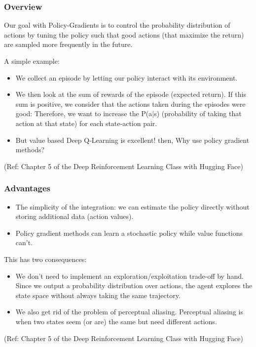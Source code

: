 \begin{frame}[fragile]\frametitle{Overview }

Our goal with Policy-Gradients is to control the probability distribution of actions by tuning the policy such that good actions (that maximize the return) are sampled more frequently in the future.

A simple example:
 
\begin{itemize}
\item We collect an episode by letting our policy interact with its environment.
\item We then look at the sum of rewards of the episode (expected return). If this sum is positive, we consider that the actions taken during the episodes were good: Therefore, we want to increase the P(a|s) (probability of taking that action at that state) for each state-action pair.
\item But value based Deep Q-Learning is excellent! then, Why use policy gradient methods?
\end{itemize}

{\tiny (Ref: Chapter 5 of the Deep Reinforcement Learning Class with Hugging Face)}

\end{frame}

\begin{frame}[fragile]\frametitle{Advantages  }

\begin{itemize}
\item The simplicity of the integration: we can estimate the policy directly without storing additional data (action values).
\item Policy gradient methods can learn a stochastic policy while value functions can't.
\end{itemize}

This has two consequences:

\begin{itemize}
\item We don't need to implement an exploration/exploitation trade-off by hand. Since we output a probability distribution over actions, the agent explores the state space without always taking the same trajectory.
\item We also get rid of the problem of perceptual aliasing. Perceptual aliasing is when two states seem (or are) the same but need different actions.
\end{itemize}
{\tiny (Ref: Chapter 5 of the Deep Reinforcement Learning Class with Hugging Face)}

\end{frame}

